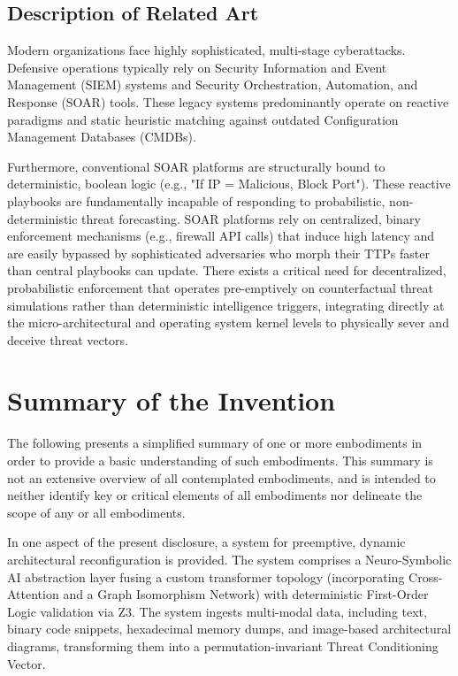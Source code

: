 \documentclass[12pt, letterpaper]{article}
\begin{document}
\subsection{Description of Related Art}
Modern organizations face highly sophisticated, multi-stage cyberattacks. Defensive operations typically rely on Security Information and Event Management (SIEM) systems and Security Orchestration, Automation, and Response (SOAR) tools. These legacy systems predominantly operate on reactive paradigms and static heuristic matching against outdated Configuration Management Databases (CMDBs).

Furthermore, conventional SOAR platforms are structurally bound to deterministic, boolean logic (e.g., "If IP = Malicious, Block Port"). These reactive playbooks are fundamentally incapable of responding to probabilistic, non-deterministic threat forecasting. SOAR platforms rely on centralized, binary enforcement mechanisms (e.g., firewall API calls) that induce high latency and are easily bypassed by sophisticated adversaries who morph their TTPs faster than central playbooks can update. There exists a critical need for decentralized, probabilistic enforcement that operates pre-emptively on counterfactual threat simulations rather than deterministic intelligence triggers, integrating directly at the micro-architectural and operating system kernel levels to physically sever and deceive threat vectors.

\section{Summary of the Invention}
The following presents a simplified summary of one or more embodiments in order to provide a basic understanding of such embodiments. This summary is not an extensive overview of all contemplated embodiments, and is intended to neither identify key or critical elements of all embodiments nor delineate the scope of any or all embodiments.

In one aspect of the present disclosure, a system for preemptive, dynamic architectural reconfiguration is provided. The system comprises a Neuro-Symbolic AI abstraction layer fusing a custom transformer topology (incorporating Cross-Attention and a Graph Isomorphism Network) with deterministic First-Order Logic validation via Z3. The system ingests multi-modal data, including text, binary code snippets, hexadecimal memory dumps, and image-based architectural diagrams, transforming them into a permutation-invariant Threat Conditioning Vector.
\end{document}
